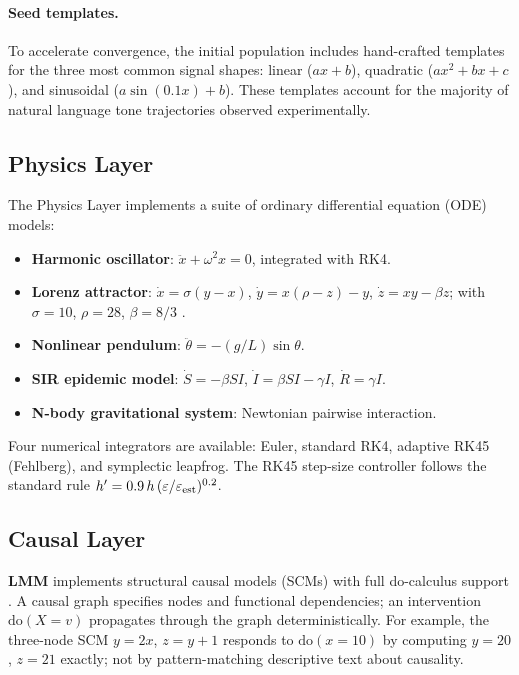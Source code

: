 \documentclass[11pt,a4paper]{article}
\newcommand{\lmm}{\texorpdfstring{%
  \textbf{\color{lmmAccent}LMM}}{LMM}}
\begin{document}
\paragraph{Seed templates.}
To accelerate convergence, the initial population includes hand-crafted templates for the three most common signal shapes: linear ($ax + b$), quadratic ($ax^2 + bx + c$), and sinusoidal ($a\sin(0.1x) + b$). These templates account for the majority of natural language tone trajectories observed experimentally.

\subsection{Physics Layer}

The Physics Layer implements a suite of ordinary differential equation (ODE) models:
\begin{itemize}[noitemsep,topsep=4pt]
  \item \textbf{Harmonic oscillator}: $\ddot{x} + \omega^2 x = 0$, integrated with RK4.
  \item \textbf{Lorenz attractor}: $\dot{x}=\sigma(y-x)$, $\dot{y}=x(\rho-z)-y$, $\dot{z}=xy-\beta z$; with $\sigma=10$, $\rho=28$, $\beta=8/3$ \citep{lorenz1963deterministic}.
  \item \textbf{Nonlinear pendulum}: $\ddot{\theta} = -(g/L)\sin\theta$.
  \item \textbf{SIR epidemic model}: $\dot{S}=-\beta SI$, $\dot{I}=\beta SI - \gamma I$, $\dot{R}=\gamma I$.
  \item \textbf{N-body gravitational system}: Newtonian pairwise interaction.
\end{itemize}
Four numerical integrators are available: Euler, standard RK4, adaptive RK45 (Fehlberg), and symplectic leapfrog. The RK45 step-size controller follows the standard rule $h' = 0.9\,h\,(\varepsilon/\varepsilon_{\rm est})^{0.2}$.

\subsection{Causal Layer}

\lmm{} implements structural causal models (SCMs) with full do-calculus support \citep{pearl2009causality}. A causal graph specifies nodes and functional dependencies; an intervention $\text{do}(X = v)$ propagates through the graph deterministically. For example, the three-node SCM $y = 2x$, $z = y + 1$ responds to $\text{do}(x=10)$ by computing $y=20$, $z=21$ exactly; not by pattern-matching descriptive text about causality.
\end{document}
